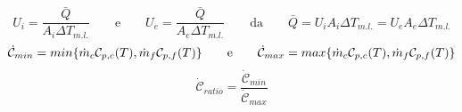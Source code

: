 \documentclass[a4paper,10pt]{article}                                                                                       %
\begin{document}
\begin{equation}                                                                                                            %
  \label{eqn:ghtc}                                                                                                          %
  U_i = \frac{\bar{Q}}{A_i\Delta{T_{m.l.}}}                                                                                 %
  \qquad\text{e}\qquad                                                                                                      %
  U_e = \frac{\bar{Q}}{A_e\Delta{T_{m.l.}}}                                                                                 %
  \qquad\text{da}\qquad                                                                                                     %
  \bar{Q} = U_iA_i\Delta{T_{m.l.}} = U_eA_e\Delta{T_{m.l.}}                                                                 %
\end{equation}                                                                                                              %
\vspace{3mm}                                                                                                                %
\begin{equation}                                                                                                            %
  \label{eqn:cpt}                                                                                                           %
  \mathcal{\dot{C}}_{min} = min\{\space\dot{m}_c\mathcal{C}_{p,c}(T),\space\dot{m}_f\mathcal{C}_{p,f}(T)\space\}            %
  \qquad\text{e}\qquad                                                                                                      %
  \mathcal{\dot{C}}_{max} = max\{\space\dot{m}_c\mathcal{C}_{p,c}(T),\space\dot{m}_f\mathcal{C}_{p,f}(T)\space\}            %
\end{equation}                                                                                                              %
\vspace{3mm}                                                                                                                %
\begin{equation}                                                                                                            %
  \label{eqn:cpt_r}                                                                                                         %
  \mathcal{\dot{C}}_{ratio} = \frac{\mathcal{\dot{C}}_{min}}{\mathcal{\dot{C}}_{max}}                                       %
\end{equation}                                                                                                              %
\end{document}
